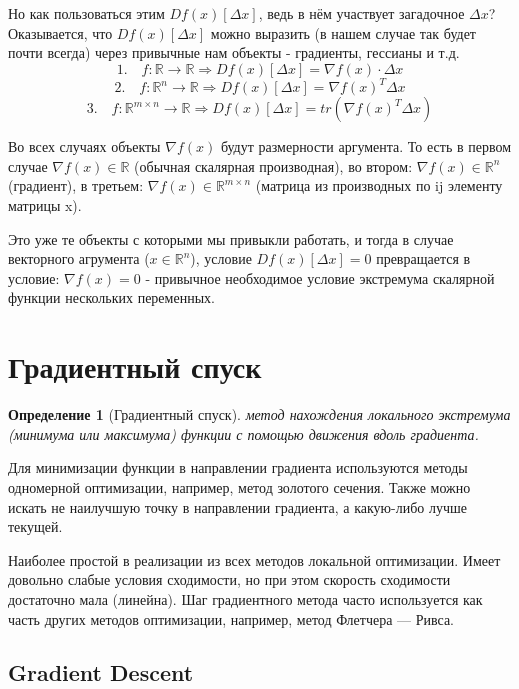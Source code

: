\documentclass[a4paper, 12pt]{article}
\theoremstyle{plain} %
\newtheorem{definition}{Определение}
\theoremstyle{definition} %
\theoremstyle{remark} %
\begin{document}
Но как пользоваться этим $Df(x)[\Delta x]$, ведь в нём участвует загадочное $\Delta x$? Оказывается, что $Df(x)[\Delta x]$ можно выразить (в нашем случае так будет почти всегда) через привычные нам объекты - градиенты, гессианы и т.д.
\[
1. \quad f: \mathbb{R} \to \mathbb{R} \Rightarrow Df(x)[\Delta x] = \nabla f(x) \cdot  \Delta x
\]
\[
2. \quad f: \mathbb{R}^n \to \mathbb{R} \Rightarrow Df(x)[\Delta x] = \nabla f(x)^T \Delta x
\]
\[
3. \quad f: \mathbb{R}^{m \times n} \to \mathbb{R} \Rightarrow Df(x)[\Delta x] = tr \left(\nabla f(x)^T \Delta x \right)
\]

Во всех случаях объекты $\nabla f(x)$ будут размерности аргумента. То есть в первом случае $\nabla f(x) \in \mathbb{R}$ (обычная скалярная производная), во втором: $\nabla f(x) \in \mathbb{R}^n$ (градиент), в третьем: $\nabla f(x) \in \mathbb{R}^{m \times n}$ (матрица из производных по ij элементу матрицы x).

Это уже те объекты с которыми мы привыкли работать, и тогда в случае векторного агрумента ($x \in \mathbb{R}^n$), условие $Df(x) [\Delta x] = 0$ превращается в условие: $\nabla f(x) = 0$ - привычное необходимое условие экстремума скалярной функции нескольких переменных.

\section{Градиентный спуск}

\begin{definition}[Градиентный спуск]
	 метод нахождения локального экстремума (минимума или максимума) функции с помощью движения вдоль градиента.
\end{definition}

Для минимизации функции в направлении градиента используются методы одномерной оптимизации, например, метод золотого сечения. Также можно искать не наилучшую точку в направлении градиента, а какую-либо лучше текущей.

Наиболее простой в реализации из всех методов локальной оптимизации. Имеет довольно слабые условия сходимости, но при этом скорость сходимости достаточно мала (линейна). Шаг градиентного метода часто используется как часть других методов оптимизации, например, метод Флетчера — Ривса.

\subsection{Gradient Descent}
\end{document}
